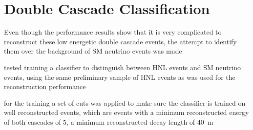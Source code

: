 


\section{Double Cascade Classification}

Even though the performance results show that it is very complicated to reconstruct these low energetic double cascade events, the attempt to identify them over the background of SM neutrino events was made

tested training a classifier to distinguish between HNL events and SM neutrino events, using the same preliminary sample of HNL events as was used for the reconstruction performance

for the training a set of cuts was applied to make sure the classifier is trained on well reconstructed events, which are events with a minimum reconstructed energy of both cascades of \SI{5}{\gev}, a minimum reconstructed decay length of \SI{40}{\meter}

